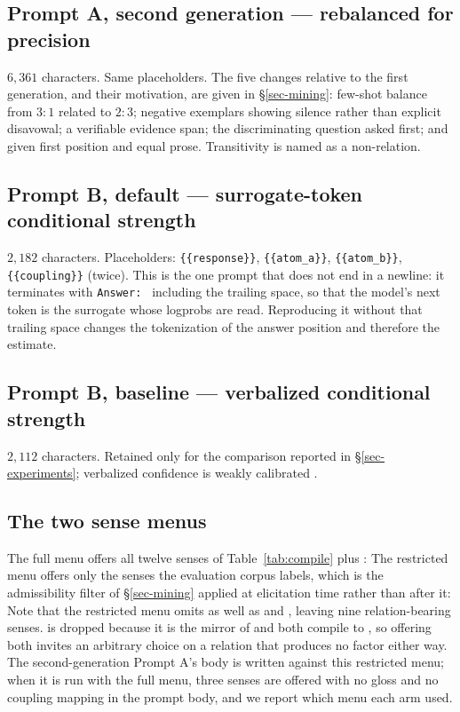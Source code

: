 \subsection{Prompt A, second generation --- rebalanced for precision}
\label{app-prompt-a2}
$6{,}361$ characters. Same placeholders. The five changes relative to the first generation, and their
motivation, are given in \S\ref{sec-mining}: few-shot balance from $3{:}1$ related to $2{:}3$; negative
exemplars showing silence rather than explicit disavowal; a verifiable evidence span; the
discriminating question asked first; and  given first position and equal prose.
Transitivity is named as a non-relation.

\subsection{Prompt B, default --- surrogate-token conditional strength}
\label{app-prompt-b1}
$2{,}182$ characters. Placeholders: \verb|{{response}}|, \verb|{{atom_a}}|, \verb|{{atom_b}}|,
\verb|{{coupling}}| (twice). This is the one prompt that does not end in a newline: it terminates with
\verb|Answer: | including the trailing space, so that the model's next token is the surrogate whose
logprobs are read. Reproducing it without that trailing space changes the tokenization of the answer
position and therefore the estimate.

\subsection{Prompt B, baseline --- verbalized conditional strength}
\label{app-prompt-b2}
$2{,}112$ characters. Retained only for the comparison reported in \S\ref{sec-experiments}; verbalized
confidence is weakly calibrated \citep{xiong}.

\subsection{The two sense menus}
\label{app-menus}
The full menu offers all twelve senses of Table~\ref{tab:compile} plus :
The restricted menu offers only the senses the evaluation corpus labels, which is the admissibility
filter of \S\ref{sec-mining} applied at elicitation time rather than after it:
Note that the restricted menu omits  as well as  and
, leaving nine relation-bearing senses.  is dropped because it is
the mirror of  and both compile to , so offering both invites an
arbitrary choice on a relation that produces no factor either way. The second-generation Prompt A's body
is written against this restricted menu; when it is run with the full menu, three senses are offered
with no gloss and no coupling mapping in the prompt body, and we report which menu each arm used.


